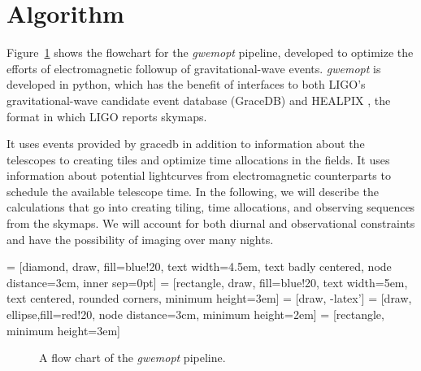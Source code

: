 \documentclass[twocolumn]{aastex61}
\begin{document}
\section{Algorithm}
\label{sec:algorithm}

Figure~\ref{fig:flowchart} shows the flowchart for the \emph{gwemopt} pipeline, developed to optimize the efforts of electromagnetic followup of gravitational-wave events. \emph{gwemopt} is developed in python, which has the benefit of interfaces to both LIGO's gravitational-wave candidate event database (GraceDB) and HEALPIX \citep{GoHi2005}, the format in which LIGO reports skymaps.

It uses events provided by gracedb in addition to information about the telescopes to creating tiles and optimize time allocations in the fields.
It uses information about potential lightcurves from electromagnetic counterparts to schedule the available telescope time.
In the following, we will describe the calculations that go into creating tiling, time allocations, and observing sequences from the skymaps.
We will account for both diurnal and observational constraints and have the possibility of imaging over many nights.

 = [diamond, draw, fill=blue!20,
    text width=4.5em, text badly centered, node distance=3cm, inner sep=0pt]
 = [rectangle, draw, fill=blue!20,
    text width=5em, text centered, rounded corners, minimum height=3em]
 = [draw, -latex']
 = [draw, ellipse,fill=red!20, node distance=3cm,
    minimum height=2em]
 = [rectangle, minimum height=3em]

\begin{figure}[t]
 \begin{center}
 \end{center}
 \caption{A flow chart of the \emph{gwemopt} pipeline.}
 \label{fig:flowchart}
\end{figure}
\end{document}

